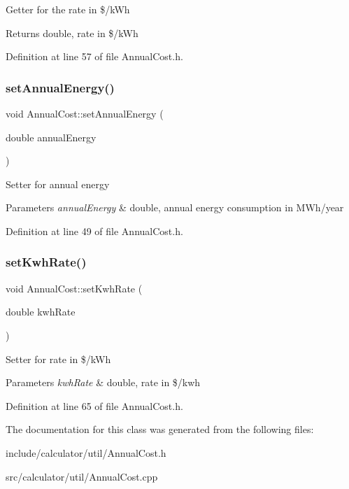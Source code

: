 Getter for the rate in \$/k\+Wh \begin{DoxyReturn}{Returns}
double, rate in \$/k\+Wh 
\end{DoxyReturn}


Definition at line 57 of file Annual\+Cost.\+h.

\mbox{\label{class_annual_cost_a4379cc7b591abefb2302d74c57227357}} 
\subsubsection{\texorpdfstring{set\+Annual\+Energy()}{setAnnualEnergy()}}
{\footnotesize\ttfamily void Annual\+Cost\+::set\+Annual\+Energy (\begin{DoxyParamCaption}\item[{double}]{annual\+Energy }\end{DoxyParamCaption})\hspace{0.3cm}{\ttfamily [inline]}}

Setter for annual energy 
\begin{DoxyParams}{Parameters}
{\em annual\+Energy} & double, annual energy consumption in M\+Wh/year \\
\hline
\end{DoxyParams}


Definition at line 49 of file Annual\+Cost.\+h.

\mbox{\label{class_annual_cost_a45a1259c9912c7202dff446c290210e9}} 
\subsubsection{\texorpdfstring{set\+Kwh\+Rate()}{setKwhRate()}}
{\footnotesize\ttfamily void Annual\+Cost\+::set\+Kwh\+Rate (\begin{DoxyParamCaption}\item[{double}]{kwh\+Rate }\end{DoxyParamCaption})\hspace{0.3cm}{\ttfamily [inline]}}

Setter for rate in \$/k\+Wh 
\begin{DoxyParams}{Parameters}
{\em kwh\+Rate} & double, rate in \$/kwh \\
\hline
\end{DoxyParams}


Definition at line 65 of file Annual\+Cost.\+h.



The documentation for this class was generated from the following files\+:\begin{DoxyCompactItemize}
\item 
include/calculator/util/Annual\+Cost.\+h\item 
src/calculator/util/Annual\+Cost.\+cpp\end{DoxyCompactItemize}
